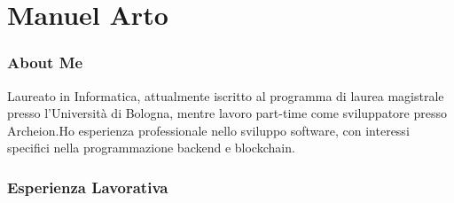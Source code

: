 \documentclass{tccv}
\begin{document}
\part{Manuel Arto}

\section{About Me}

Laureato in Informatica, attualmente iscritto al programma di laurea magistrale presso l'Università di Bologna, mentre lavoro part-time come sviluppatore presso Archeion.\newline Ho esperienza professionale nello sviluppo software, con interessi specifici nella programmazione backend e blockchain.

\section{Esperienza Lavorativa}
\end{document}

